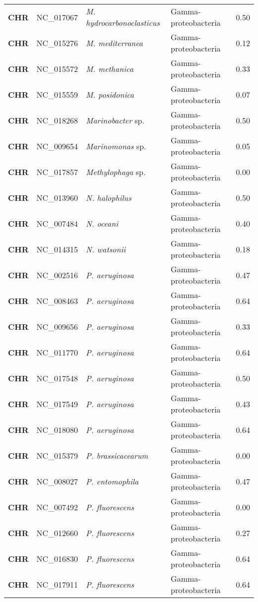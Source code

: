 \begin{adjustwidth}{-3cm}{2cm}
{\begin{supertabular}{>{\bfseries}l|p{0.1\textwidth}p{0.14\textwidth}l|l}
CHR & NC\_017067 & \textit{M. hydrocarbonoclasticus} & Gamma-proteobacteria & 0.50\\
CHR & NC\_015276 & \textit{M. mediterranea} & Gamma-proteobacteria & 0.12\\
CHR & NC\_015572 & \textit{M. methanica} & Gamma-proteobacteria & 0.33\\
CHR & NC\_015559 & \textit{M. posidonica} & Gamma-proteobacteria & 0.07\\
CHR & NC\_018268 & \textit{Marinobacter} sp. & Gamma-proteobacteria & 0.50\\
CHR & NC\_009654 & \textit{Marinomonas} sp. & Gamma-proteobacteria & 0.05\\
CHR & NC\_017857 & \textit{Methylophaga} sp. & Gamma-proteobacteria & 0.00\\
CHR & NC\_013960 & \textit{N. halophilus} & Gamma-proteobacteria & 0.50\\
CHR & NC\_007484 & \textit{N. oceani} & Gamma-proteobacteria & 0.40\\
CHR & NC\_014315 & \textit{N. watsonii} & Gamma-proteobacteria & 0.18\\
CHR & NC\_002516 & \textit{P. aeruginosa} & Gamma-proteobacteria & 0.47\\
CHR & NC\_008463 & \textit{P. aeruginosa} & Gamma-proteobacteria & 0.64\\
CHR & NC\_009656 & \textit{P. aeruginosa} & Gamma-proteobacteria & 0.33\\
CHR & NC\_011770 & \textit{P. aeruginosa} & Gamma-proteobacteria & 0.64\\
CHR & NC\_017548 & \textit{P. aeruginosa} & Gamma-proteobacteria & 0.50\\
CHR & NC\_017549 & \textit{P. aeruginosa} & Gamma-proteobacteria & 0.43\\
CHR & NC\_018080 & \textit{P. aeruginosa} & Gamma-proteobacteria & 0.64\\
CHR & NC\_015379 & \textit{P. brassicacearum} & Gamma-proteobacteria & 0.00\\
CHR & NC\_008027 & \textit{P. entomophila} & Gamma-proteobacteria & 0.47\\
CHR & NC\_007492 & \textit{P. fluorescens} & Gamma-proteobacteria & 0.00\\
CHR & NC\_012660 & \textit{P. fluorescens} & Gamma-proteobacteria & 0.27\\
CHR & NC\_016830 & \textit{P. fluorescens} & Gamma-proteobacteria & 0.64\\
CHR & NC\_017911 & \textit{P. fluorescens} & Gamma-proteobacteria & 0.64\\

\end{supertabular}}
\end{adjustwidth}
